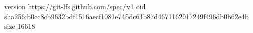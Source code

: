 version https://git-lfs.github.com/spec/v1
oid sha256:b0cc8cb9632bdf1516aecf1081e745dc61b87d4671162917249f496db0b62e4b
size 16618

